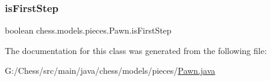 \subsubsection{\texorpdfstring{is\+First\+Step}{isFirstStep}}
{\footnotesize\ttfamily boolean chess.\+models.\+pieces.\+Pawn.\+is\+First\+Step\hspace{0.3cm}{\ttfamily [private]}}



The documentation for this class was generated from the following file\+:\begin{DoxyCompactItemize}
\item 
G\+:/\+Chess/src/main/java/chess/models/pieces/\mbox{\hyperlink{_pawn_8java}{Pawn.\+java}}\end{DoxyCompactItemize}
